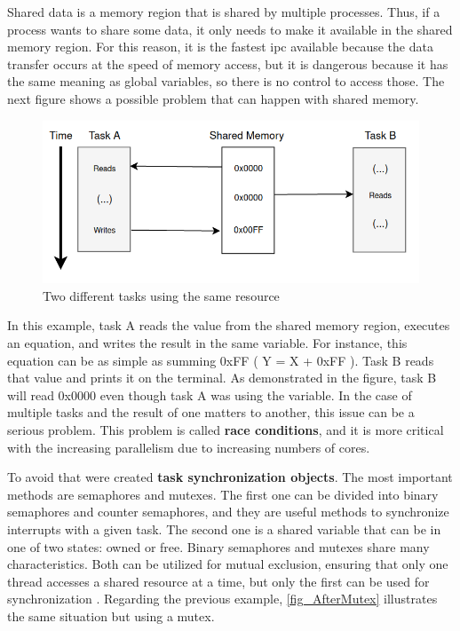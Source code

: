 Shared data is a memory region that is shared by multiple processes. Thus, if a process wants to share some data, it only needs to make it 
available in the shared memory region. For this reason, it is the fastest \gls{ipc} available because the data transfer occurs at the speed of 
memory access, but it is dangerous because it has the same meaning as global variables, so there is no control to access those. The next figure 
shows a possible problem that can happen with shared memory.

\begin{figure}[H]
	\centering
 	\includegraphics[width=0.7\linewidth]{Images/BeforeMutex.png}
 	\caption{ Two different tasks using the same resource }
	 \label{fig_BeforeMutex}
\end{figure}

In this example, task A reads the value from the shared memory region, executes an equation, and writes the result in the same variable. For 
instance, this equation can be as simple as summing 0xFF ( Y = X + 0xFF ). Task B reads that value and prints it on the terminal. As demonstrated 
in the figure, task B will read 0x0000 even though task A was using the variable. In the case of multiple tasks and the result of one matters to 
another, this issue can be a serious problem. This problem is called \textbf{race conditions}, and it is more critical with the increasing 
parallelism due to increasing numbers of cores.

To avoid that were created \textbf{task synchronization objects}. The most important methods are semaphores and mutexes. The first one can be 
divided into binary semaphores and counter semaphores, and they are useful methods to synchronize interrupts with a given task. The second one is 
a shared variable that can be in one of two states: owned or free. Binary semaphores and mutexes share many characteristics. Both can be utilized 
for mutual exclusion, ensuring that only one thread accesses a shared resource at a time, but only the first can be used for synchronization 
\cite{OSbook2}. Regarding the previous example, \autoref{fig_AfterMutex} illustrates the same situation but using a mutex.

